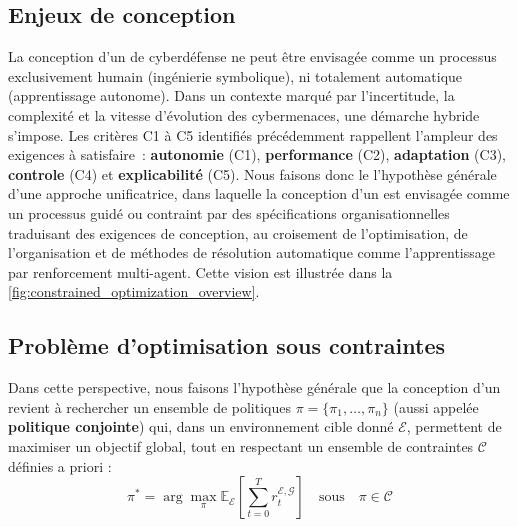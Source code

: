 \subsection{Enjeux de conception}

La conception d'un  de cyberdéfense ne peut être envisagée comme un processus exclusivement humain (ingénierie symbolique), ni totalement automatique (apprentissage autonome). Dans un contexte marqué par l'incertitude, la complexité et la vitesse d'évolution des cybermenaces, une démarche hybride s'impose.
%
Les critères C1 à C5 identifiés précédemment rappellent l'ampleur des exigences à satisfaire~: \textbf{autonomie} (C1), \textbf{performance} (C2), \textbf{adaptation} (C3), \textbf{controle} (C4) et \textbf{explicabilité} (C5).
%
Nous faisons donc le l'hypothèse générale d'une approche unificatrice, dans laquelle la conception d'un  est envisagée comme un processus guidé ou contraint par des spécifications organisationnelles traduisant des exigences de conception, au croisement de l'optimisation, de l'organisation et de méthodes de résolution automatique comme l'apprentissage par renforcement multi-agent. Cette vision est illustrée dans la \autoref{fig:constrained_optimization_overview}.

\subsection{Problème d'optimisation sous contraintes}

Dans cette perspective, nous faisons l'hypothèse générale que la conception d'un  revient à rechercher un ensemble de politiques $\pi = \{\pi_1, \dots, \pi_n\}$ (aussi appelée \textbf{politique conjointe}) qui, dans un environnement cible donné $\mathcal{E}$, permettent de maximiser un objectif global, tout en respectant un ensemble de contraintes $\mathcal{C}$ définies a priori :
%
\begin{equation*}
  \pi^* = \arg\max_{\pi} \mathbb{E}_{\mathcal{E}} \left[ \sum_{t=0}^{T} r^{\mathcal{E}, \mathcal{G}}_t \right] \quad \text{sous} \quad \pi \in \mathcal{C}
\end{equation*}

